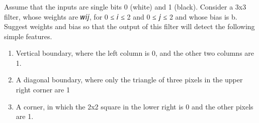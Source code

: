 \documentclass[10pt, a4paper]{article}
\begin{document}
\newpage
\subsubsection*{}
\begin{Problem}
    Assume that the inputs are single bits 0 (white) and 1 (black). Consider a 3x3
    filter, whose weights are 𝑤𝑖𝑗, for 0 ≤ 𝑖 ≤ 2 and 0 ≤ 𝑗 ≤ 2 and whose bias
    is b. Suggest weights and bias so that the output of this filter will detect the
    following simple features.
    \begin{enumerate}[label=\textbf{(\alph*)}]
        \item Vertical boundary, where the left column is 0, and the other two columns are 1.
        \item A diagonal boundary, where only the triangle of three pixels in the upper right corner are 1
        \item A corner, in which the 2x2 square in the lower right is 0 and the other pixels \\ are 1.
    \end{enumerate}
\end{Problem}
\end{document}
